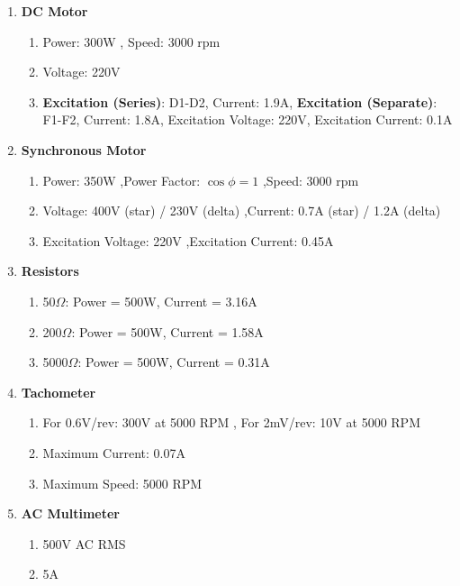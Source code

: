 \documentclass[a4paper,12pt]{article}
\begin{document}
	
	\begin{enumerate}
		\item \textbf{DC Motor}
		\begin{enumerate}
			\item Power: 300W , Speed: 3000 rpm
			\item Voltage: 220V
			\item \textbf{Excitation (Series)}: D1-D2, Current: 1.9A, \textbf{Excitation (Separate)}: F1-F2, Current: 1.8A, Excitation Voltage: 220V, Excitation Current: 0.1A
			
		\end{enumerate}
		
		\item \textbf{Synchronous Motor}
		\begin{enumerate}
			\item Power: 350W ,Power Factor: $\cos\phi = 1$ ,Speed: 3000 rpm
			
			\item Voltage: 400V (star) / 230V (delta) ,Current: 0.7A (star) / 1.2A (delta) 
			\item Excitation Voltage: 220V ,Excitation Current: 0.45A
			
		\end{enumerate}
		
		\item \textbf{Resistors}
		\begin{enumerate}
			\item 50$\Omega$: Power = 500W, Current = 3.16A
			\item 200$\Omega$: Power = 500W, Current = 1.58A
			\item 5000$\Omega$: Power = 500W, Current = 0.31A
		\end{enumerate}
		
		\item \textbf{Tachometer}
		\begin{enumerate}
			\item For 0.6V/rev: 300V at 5000 RPM , For 2mV/rev: 10V at 5000 RPM
			\item Maximum Current: 0.07A
			\item Maximum Speed: 5000 RPM
		\end{enumerate}
		
		\item \textbf{AC Multimeter}
		\begin{enumerate}
			\item 500V AC RMS
			\item 5A
		\end{enumerate}
	\end{enumerate}
	\newpage
\end{document}
